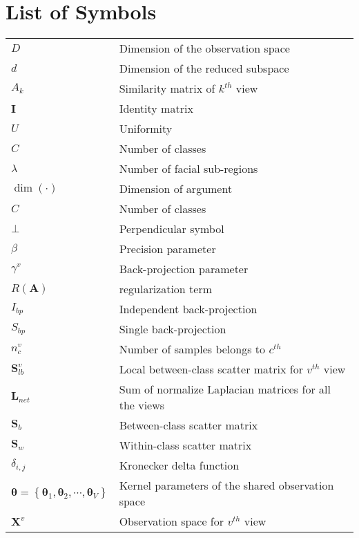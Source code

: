 \chapter*{List of Symbols}

\begin{longtable}{ll}


$D$                 & Dimension of the observation space \\
$d$                 & Dimension of the reduced subspace \\
$A_k$               & Similarity matrix of $k^{th}$ view \\
$\mathbf{I}$        & Identity matrix\\
$U$                 & Uniformity \\
$C$                 & Number of classes \\
$\lambda$           & Number of facial sub-regions \\
$\dim \left(  \cdot  \right)$ & Dimension of argument \\
$C$                 & Number of classes \\
$ \bot $            & Perpendicular symbol \\ 
$\beta$             & Precision parameter \\
${\gamma ^v}$       & Back-projection parameter\\
$R\left( {\mathbf{A}} \right)$  & regularization term \\
$I_{bp}$            & Independent back-projection \\
$S_{bp}$            & Single back-projection \\
${n_c^v}$           & Number of samples belongs to $c^{th}$ \\
${\mathbf{S}}_{lb}^v$ & Local between-class scatter matrix for $v^{th}$ view \\
${{\mathbf{L}}_{net}}$ & Sum of normalize Laplacian matrices for all the views \\
${{{\mathbf{S}}_b}}$ & Between-class scatter matrix \\
${{{\mathbf{S}}_w}}$ & Within-class scatter matrix \\
${{\delta _{i,j}}}$ & Kronecker delta function \\
${\bm{\theta }} = \left\{ {{{\bm{\theta }}_1},{{\bm{\theta }}_2}, \cdots ,{{\bm{\theta }}_V}} \right\}$   & Kernel parameters of the shared observation space \\
${\mathbf{X}}^v$     & Observation space for $v^{th}$ view \\

\end{longtable}
